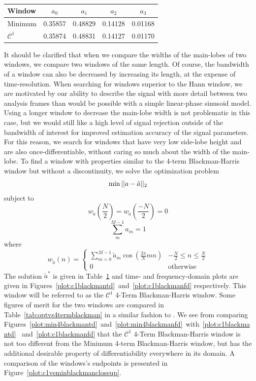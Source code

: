 \begin{table}[!b]
    \caption{\label{tab:optblackman}}
    \begin{center}
        \begin{tabular}{l c c c c }
            Window & $a_0$ & $a_1$ & $a_2$ & $a_3$ \\
            \hline
            Minimum & 0.35857 & 0.48829 & 0.14128 &
            0.01168 \\
            $\mathcal{C}^{1}$ & 0.35874 & 0.48831 &
            0.14127 & 0.01170
        \end{tabular}
    \end{center}
\end{table}%

It should be clarified that when we compare the widths of the main-lobes of two
windows, we compare two windows of the same length. Of course, the bandwidth of
a window can also be decreased by increasing its length, at the expense of
time-resolution. When searching for windows superior to the Hann window, we are
motivated by our ability to describe the signal with more detail between two
analysis frames than would be possible with a simple linear-phase sinusoid
model. Using a longer window to decrease the main-lobe width is not problematic
in this case, but we would still like a high level of signal rejection outside
of the bandwidth of interest for improved estimation accuracy of the signal
parameters. For this reason, we search for windows that have very low side-lobe
height and are also once-differentiable, without caring so much about the width
of the main-lobe. To find a window with properties similar to the 4-term
Blackman-Harris window but without a discontinuity, we solve the optimization
problem
\[
        \min||a-\tilde{a}||_2 \\
\]
subject to
\[
        w_{\tilde{a}} \left( \frac{N}{2} \right)
            = w_{\tilde{a}} \left( \frac{-N}{2} \right) = 0
\]
\[
        \sum_{m}^{M-1} a_{m} = 1
\]
where
\[
    w_{\tilde{a}}(n) = \begin{cases}
        \sum_{m=0}^{M-1}\tilde{a}_{m}\cos \left( \frac{2\pi}{N}mn \right) & -\frac{N}{2} \leq n
        \leq \frac{N}{2} \\
        0 & \text{otherwise}
    \end{cases}
\]
The solution $\tilde{a}^{\ast}$ is given in Table~\ref{tab:optblackman} and
time- and frequency-domain plots are given in
Figures~\ref{plot:c1blackmantd}~and~\ref{plot:c1blackmanfd} respectively. This
window will be referred to as the $\mathcal{C}^{1}$ 4-Term Blackman-Harris
window. Some figures of merit for the two windows are compared in
Table~\ref{tab:optvs4termblackman} in a similar fashion to \cite{harris1978use}.
We see from comparing
Figures~\ref{plot:min4blackmantd}~and~\ref{plot:min4blackmanfd}~with~\ref{plot:c1blackmantd}
~and~\ref{plot:c1blackmanfd}
that the $\mathcal{C}^{1}$ 4-Term Blackman-Harris window is not too different
from the Minimum 4-term Blackman-Harris window, but has the additional desirable
property of differentiability everywhere in its domain. A comparison of the
windows's endpoints is presented in Figure~\ref{plot:c1vsminblackmancloseup}.

